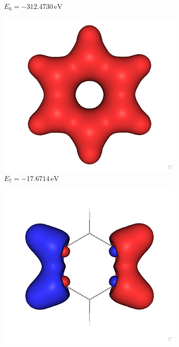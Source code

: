 \documentclass[9pt]{report}
\begin{document}
\begin{figure}[H]
\begin{subfigure}[b]{0.23\textwidth}
		\caption[]{{\small $E_6=-312.4730\,\mathrm{eV}$}}    
	\end{subfigure}
	\begin{subfigure}[b]{0.23\textwidth}   
		\centering 
		\includegraphics[width=\textwidth]{Benzol-7.png}
		\caption[]{{\small $E_7=-17.6714\,\mathrm{eV}$}}    
	\end{subfigure}
	\hfill
	\begin{subfigure}[b]{0.23\textwidth}   
		\centering 
		\includegraphics[width=\textwidth]{Benzol-8.png}

\end{subfigure}
\end{figure}
\end{document}
